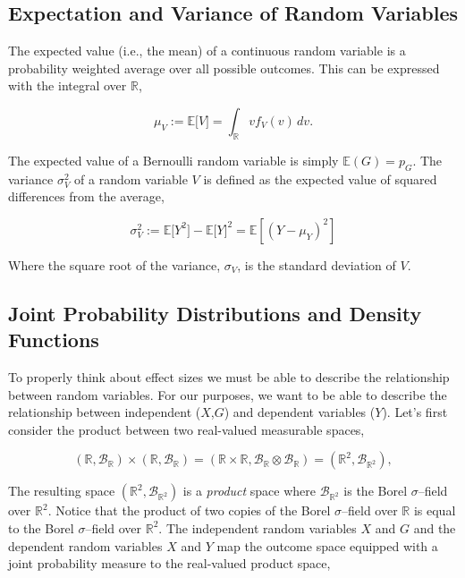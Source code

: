 \documentclass[
  letterpaper,
  DIV=11,
  numbers=noendperiod]{scrreprt}
\begin{document}
\subsection{Expectation and Variance of Random
Variables}\label{expectation-and-variance-of-random-variables}

The expected value (i.e., the mean) of a continuous random variable is a
probability weighted average over all possible outcomes. This can be
expressed with the integral over \(\mathbb{R}\),

\[
\mu_V := \mathbb{E}\lbrack V\rbrack  = \int_\mathbb{R} v f_V(v) \, dv. 
\]

The expected value of a Bernoulli random variable is simply
\(\mathbb{E}(G)= p_G\). The variance \(\sigma^2_V\) of a random variable
\(V\) is defined as the expected value of squared differences from the
average,

\[
\sigma^2_V := \mathbb{E}\lbrack Y^2\rbrack - \mathbb{E}\lbrack Y\rbrack^2 = \mathbb{E}\left[(Y-\mu_Y)^2\right]
\]

Where the square root of the variance, \(\sigma_V\), is the standard
deviation of \(V\).

\subsection{Joint Probability Distributions and Density
Functions}\label{joint-probability-distributions-and-density-functions}

To properly think about effect sizes we must be able to describe the
relationship between random variables. For our purposes, we want to be
able to describe the relationship between independent (\(X\),\(G\)) and
dependent variables (\(Y\)). Let's first consider the product between
two real-valued measurable spaces,

\[
(\mathbb{R},\mathcal{B}_\mathbb{R}) \times(\mathbb{R},\mathcal{B}_\mathbb{R}) = (\mathbb{R}\times \mathbb{R},\mathcal{B}_\mathbb{R} \otimes \mathcal{B}_\mathbb{R}) = (\mathbb{R}^2,\mathcal{B}_{\mathbb{R}^2}),
\]

The resulting space \((\mathbb{R}^2,\mathcal{B}_{\mathbb{R}^2})\) is a
\emph{product} space where \(\mathcal{B}_{\mathbb{R}^2}\) is the Borel
\(\sigma\)--field over \(\mathbb{R}^2\). Notice that the product of two
copies of the Borel \(\sigma\)--field over \(\mathbb{R}\) is equal to
the Borel \(\sigma\)--field over \(\mathbb{R}^2\). The independent
random variables \(X\) and \(G\) and the dependent random variables
\(X\) and \(Y\) map the outcome space equipped with a joint probability
measure to the real-valued product space,
\end{document}
